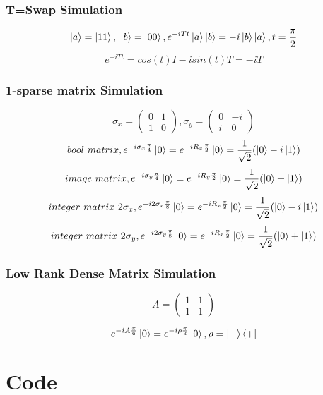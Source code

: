 \documentclass{article}
\begin{document}
\subsubsection{T=Swap Simulation}
	$$ \ket{a}=\ket{11},\ \ket{b}=\ket{00}, e^{-iTt}\ket{a}\ket{b} = -i\ket{b}\ket{a}, t=\frac{\pi}{2} $$ $$e^{-iTt} = cos(t)I - isin(t)T = -iT $$
\subsubsection{1-sparse matrix Simulation}
$$ \sigma_x =\left(\begin{matrix}
	0 & 1 \\
	1& 0
	\end{matrix}\right),
	\sigma_y = \left(\begin{matrix}
	0 & -i \\
	i & 0 
	\end{matrix}\right)
	$$
	$$ bool\  matrix, e^{-i\sigma_x \frac{\pi}{4} }\ket{0}=e^{-iR_x \frac{\pi}{2} }\ket{0} = \frac{1}{\sqrt{2}}(\ket{0}-i\ket{1}) $$
	$$ image \  matrix, e^{-i\sigma_y \frac{\pi}{4} }\ket{0}=e^{-iR_y \frac{\pi}{2} }\ket{0} = \frac{1}{\sqrt{2}}(\ket{0}+\ket{1}) $$	
	$$ integer\ matrix\  2\sigma_x, e^{-i2\sigma_x \frac{\pi}{8} }\ket{0}=e^{-iR_x \frac{\pi}{2} }\ket{0} = \frac{1}{\sqrt{2}}(\ket{0}-i\ket{1}) $$
	$$ integer\ matrix\  2\sigma_y, e^{-i2\sigma_y \frac{\pi}{8} }\ket{0}=e^{-iR_x \frac{\pi}{2} }\ket{0} = \frac{1}{\sqrt{2}}(\ket{0}+\ket{1}) $$
\subsubsection{Low Rank Dense Matrix Simulation}
$$ A=\begin{pmatrix}
1 &1 \\
1 & 1
\end{pmatrix}$$

$$ e^{-iA\frac{\pi}{6}}\ket{0} = e^{-i\rho\frac{\pi}{3}}\ket{0}, \rho = \ket{+}\bra{+}$$
\section{Code}
\end{document}

